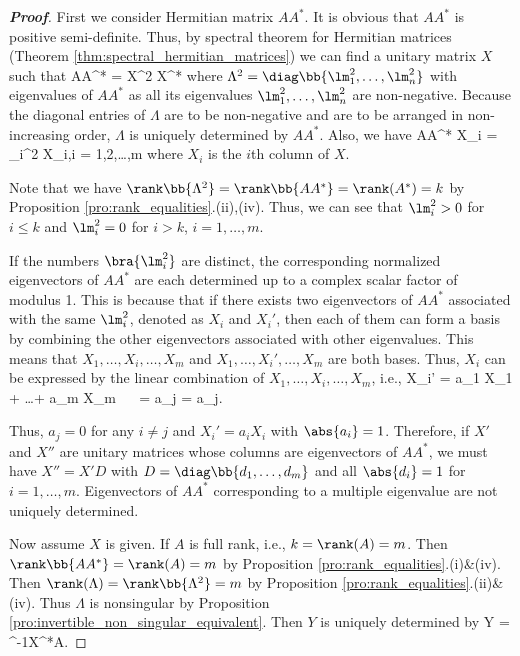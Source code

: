 \begin{proof}[\bf Proof]
First we consider Hermitian matrix $AA^*$. It is obvious that $AA^*$ is positive semi-definite. Thus, by spectral theorem for Hermitian matrices (Theorem \ref{thm:spectral_hermitian_matrices}) we
can find a unitary matrix $X$ such that
\be
AA^* = X\Lambda^2 X^*
\ee
where $\Lambda^2 = \diag\bb{\lm_1^2,\dots,\lm_n^2}$ with eigenvalues of $AA^*$ as all its eigenvalues $\lm_1^2,\dots,\lm_n^2$ are non-negative. Because the diagonal entries of $\Lambda$ are to be
non-negative and are to be arranged in non-increasing order, $\Lambda$ is uniquely determined by $AA^*$. Also, we have
\be
AA^* X_i = \lm_i^2 X_i,\quad i = 1,2,\dots,m
\ee
where $X_i$ is the $i$th column of $X$.

Note that we have $\rank\bb{\Lambda^2} = \rank\bb{AA^*} = \rank (A^*) = k$ by Proposition \ref{pro:rank_equalities}.(ii),(iv). Thus, we can see that $\lm_i^2 > 0$ for $i\leq k$ and $\lm_i^2 = 0$ for $i>k$, $i=1,\dots,m$.

If the numbers $\bra{\lm_i^2}$ are distinct, the corresponding normalized eigenvectors of $AA^*$ are each determined up to a complex scalar factor of modulus
1. This is because that if there exists two eigenvectors of $AA^*$ associated with the same $\lm_i^2$, denoted as $X_i$ and $X_i'$, then each of them can form a basis by combining the other
eigenvectors associated with other eigenvalues. This means that $X_1,\dots,X_i,\dots,X_m$ and $X_1,\dots,X_i',\dots,X_m$ are both bases. Thus, $X_i$ can be expressed by the linear combination of
$X_1,\dots,X_i,\dots,X_m$, i.e.,
\be
X_i' = a_1 X_1 + \dots + a_m X_m \ \ra\  = a_j = a_j.
\ee

Thus, $a_j = 0$ for any $i\neq j$ and $X_i' = a_i X_i$ with $\abs{a_i} = 1$. Therefore, if $X'$ and $X''$ are unitary matrices whose columns are eigenvectors of $AA^*$, we must have $X'' = X'D$
with $D = \diag\bb{d_1,\dots,d_m}$ and all $\abs{d_i} = 1$ for $i = 1,\dots,m$. Eigenvectors of $AA^*$ corresponding to a multiple eigenvalue are not uniquely determined.%

Now assume $X$ is given. If $A$ is full rank, i.e., $k = \rank(A) = m$. Then $\rank\bb{AA^*} = \rank (A) =m$ by Proposition \ref{pro:rank_equalities}.(i)\&(iv). Then $\rank(\Lambda) =
\rank\bb{\Lambda^2} = m$ by Proposition \ref{pro:rank_equalities}.(ii)\&(iv). Thus $\Lambda$ is nonsingular by Proposition \ref{pro:invertible_non_singular_equivalent}. Then $Y$ is uniquely determined by
\be
Y = \Lambda^{-1}X^*A.
\ee


\end{proof}
